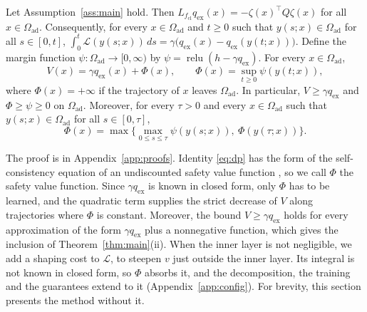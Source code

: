 \documentclass{l4dc2027}
\newcommand{\Oad}{\Omega_{\mathrm{ad}}}
\newcommand{\qex}{q_{\mathrm{ex}}}
\newcommand{\relu}{\operatorname{relu}}
\begin{document}
\begin{lemma}\label{lem:split}
Let Assumption~\ref{ass:main} hold. Then $L_{f_{\mathrm{cl}}}\qex(x)=-\zeta(x)^\top Q\zeta(x)$ for all $x\in\Oad$. Consequently, for every $x\in\Oad$ and $t\ge0$ such that $y(s;x)\in\Oad$ for all $s\in[0,t]$, $\int_0^t\mathcal L(y(s;x))\,ds=\gamma\big(\qex(x)-\qex(y(t;x))\big)$. Define the margin function $\psi:\Oad\to[0,\infty)$ by $\psi=\relu(h-\gamma\qex)$. For every $x\in\Oad$,
\begin{equation}\label{eq:split}
V(x)=\gamma\qex(x)+\Phi(x),\qquad \Phi(x)=\sup_{t\ge0}\psi(y(t;x)),
\end{equation}
where $\Phi(x)=+\infty$ if the trajectory of $x$ leaves $\Oad$. In particular, $V\ge\gamma\qex$ and $\Phi\ge\psi\ge0$ on $\Oad$. Moreover, for every $\tau>0$ and every $x\in\Oad$ such that $y(s;x)\in\Oad$ for all $s\in[0,\tau]$,
\begin{equation}\label{eq:dp}
\Phi(x)=\max\Big\{\max_{0\le s\le\tau}\psi(y(s;x)),\ \Phi(y(\tau;x))\Big\}.
\end{equation}
\end{lemma}
 The proof is in Appendix~\ref{app:proofs}. Identity \eqref{eq:dp} has the form of the self-consistency equation of an undiscounted safety value function \citep{yu2022}, so we call $\Phi$ the safety value function. Since $\gamma\qex$ is known in closed form, only $\Phi$ has to be learned, and the quadratic term supplies the strict decrease of $V$ along trajectories where $\Phi$ is constant. Moreover, the bound $V\ge\gamma\qex$ holds for every approximation of the form $\gamma\qex$ plus a nonnegative function, which gives the inclusion of Theorem~\ref{thm:main}(ii). When the inner layer is not negligible, we add a shaping cost to $\mathcal L$, to steepen $v$ just outside the inner layer. Its integral is not known in closed form, so $\Phi$ absorbs it, and the decomposition, the training and the guarantees extend to it (Appendix~\ref{app:config}). For brevity, this section presents the method without it.

\vspace{-0.075in}
\end{document}
